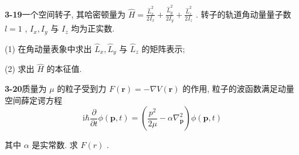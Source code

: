 \vfill

\newpage
\vfill

\noindent
\textbf{3-19}\quad 一个空间转子, 其哈密顿量为 $\hat{H} = \frac{\hat{L}_x^2}{2I_x} + \frac{\hat{L}_y^2}{2I_y} + \frac{\hat{L}_z^2}{2I_z}$ . 转子的轨道角动量量子数 $l = 1$ , $I_x, I_y$ 与 $I_z$ 均为正实数. 

(1) 在角动量表象中求出 $\hat{L}_x, \hat{L}_y$ 与 $\hat{L}_z$ 的矩阵表示; 

(2) 求出 $\hat{H}$ 的本征值.

\vfill

\newpage
\vfill

\noindent
\textbf{3-20}\quad 质量为 $\mu$ 的粒子受到力 $F(\boldsymbol{r}) = -\nabla V(\boldsymbol{r})$ 的作用, 粒子的波函数满足动量空间薛定谔方程
$$
\mathrm{i} \hbar \frac {\partial}{\partial t} \phi (\boldsymbol {p}, t) = \left(\frac {p ^ {2}}{2 \mu} - \alpha \nabla_ {\boldsymbol {p}} ^ {2}\right) \phi (\boldsymbol {p}, t)
$$

其中 $\alpha$ 是实常数. 求 $F(r)$ .

\vfill

\newpage